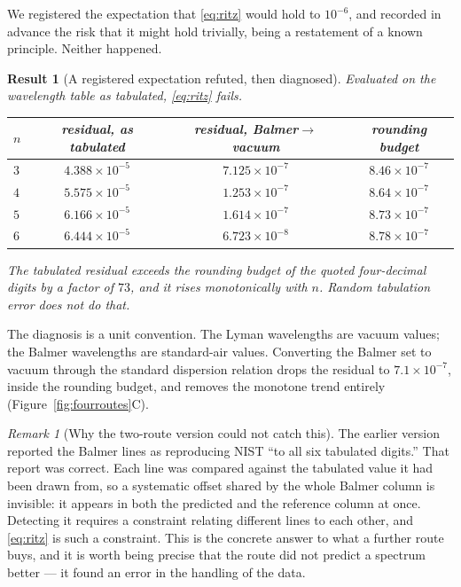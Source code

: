 \documentclass[11pt,a4paper]{article}
\theoremstyle{stmtstyle}
\newtheorem{result}{Result}
\theoremstyle{definition}
\theoremstyle{remark}
\newtheorem*{remark}{Remark}
\begin{document}
We registered the expectation that \eqref{eq:ritz} would hold to
$10^{-6}$, and recorded in advance the risk that it might hold trivially,
being a restatement of a known principle. Neither happened.

\begin{result}[A registered expectation refuted, then diagnosed]
\label{res:ritz}
Evaluated on the wavelength table as tabulated, \eqref{eq:ritz} fails.
\begin{center}\small
\begin{tabular}{lccc}
\toprule
$n$ & residual, as tabulated & residual, Balmer$\to$vacuum & rounding budget\\
\midrule
$3$ & $4.388\times10^{-5}$ & $7.125\times10^{-7}$ & $8.46\times10^{-7}$\\
$4$ & $5.575\times10^{-5}$ & $1.253\times10^{-7}$ & $8.64\times10^{-7}$\\
$5$ & $6.166\times10^{-5}$ & $1.614\times10^{-7}$ & $8.73\times10^{-7}$\\
$6$ & $6.444\times10^{-5}$ & $6.723\times10^{-8}$ & $8.78\times10^{-7}$\\
\bottomrule
\end{tabular}
\end{center}
The tabulated residual exceeds the rounding budget of the quoted
four-decimal digits by a factor of $73$, and it rises monotonically with
$n$. Random tabulation error does not do that.
\end{result}

The diagnosis is a unit convention. The Lyman wavelengths are vacuum
values; the Balmer wavelengths are standard-air values. Converting the
Balmer set to vacuum through the standard dispersion relation drops the
residual to $7.1\times10^{-7}$, inside the rounding budget, and removes the
monotone trend entirely (Figure~\ref{fig:fourroutes}C).

\begin{remark}[Why the two-route version could not catch this]
\label{rem:whycaught}
The earlier version reported the Balmer lines as reproducing NIST ``to all
six tabulated digits.'' That report was correct. Each line was compared
against the tabulated value it had been drawn from, so a systematic offset
shared by the whole Balmer column is invisible: it appears in both the
predicted and the reference column at once. Detecting it requires a
constraint relating different lines to each other, and \eqref{eq:ritz} is
such a constraint. This is the concrete answer to what a further route
buys, and it is worth being precise that the route did not predict a
spectrum better --- it found an error in the handling of the data.
\end{remark}
\end{document}

